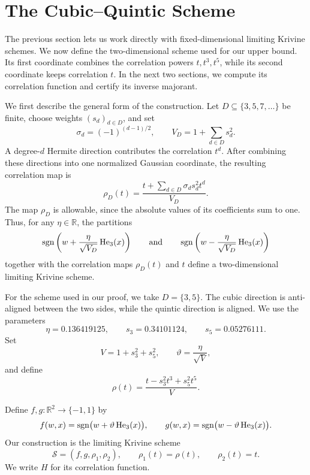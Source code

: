 \section{The Cubic--Quintic Scheme}
\label{sec:scheme}

The previous section lets us work directly with fixed-dimensional limiting
Krivine schemes. We now define the two-dimensional scheme used for our upper
bound. Its first coordinate combines the correlation powers \(t,t^3,t^5\),
while its second coordinate keeps correlation \(t\). In the next two sections,
we compute its correlation function and certify its inverse majorant.

We first describe the general form of the construction. Let
\(D\subseteq\{3,5,7,\ldots\}\) be finite, choose weights
\((s_d)_{d\in D}\), and set
\[
    \sigma_d=(-1)^{(d-1)/2},
    \qquad
    V_D=1+\sum_{d\in D}s_d^2.
\]
A degree-\(d\) Hermite direction contributes the correlation \(t^d\).
After combining these directions into one normalized Gaussian coordinate,
the resulting correlation map is
\begin{equation}
    \rho_D(t)
    =
    \frac{t+\sum_{d\in D}\sigma_d s_d^2 t^d}{V_D}.
    \label{eq:general-hermite-correlation-map}
\end{equation}
The map \(\rho_D\) is allowable, since the absolute values of its
coefficients sum to one. Thus, for any \(\eta\in\mathbb{R}\), the partitions
\[
    \operatorname{sgn}\left(
        w+\frac{\eta}{\sqrt{V_D}}\operatorname{He}_3(x)
    \right)
    \qquad\text{and}\qquad
    \operatorname{sgn}\left(
        w-\frac{\eta}{\sqrt{V_D}}\operatorname{He}_3(x)
    \right)
\]
together with the correlation maps \(\rho_D(t)\) and \(t\) define a
two-dimensional limiting Krivine scheme.

For the scheme used in our proof, we take \(D=\{3,5\}\). The cubic
direction is anti-aligned between the two sides, while the quintic direction
is aligned. We use the parameters
\begin{equation}
    \eta=0.136419125,
    \qquad
    s_3=0.34101124,
    \qquad
    s_5=0.05276111.
    \label{eq:params}
\end{equation}
Set
\[
    V=1+s_3^2+s_5^2,
    \qquad
    \vartheta=\frac{\eta}{\sqrt V},
\]
and define
\begin{equation}
    \rho(t)
    =
    \frac{t-s_3^2t^3+s_5^2t^5}{V}.
    \label{eq:rho-collapsed}
\end{equation}

\begin{definition}
\label{def:cubic-quintic-scheme}
Define \(f,g:\mathbb{R}^2\to\{-1,1\}\) by
\begin{equation}
    f(w,x)
    =
    \operatorname{sgn}\bigl(w+\vartheta\operatorname{He}_3(x)\bigr),
    \qquad
    g(w,x)
    =
    \operatorname{sgn}\bigl(w-\vartheta\operatorname{He}_3(x)\bigr).
    \label{eq:cubic-quintic-partitions}
\end{equation}
Our construction is the limiting Krivine scheme
\[
    \mathcal{S}=(f,g,\rho_1,\rho_2),
    \qquad
    \rho_1(t)=\rho(t),
    \qquad
    \rho_2(t)=t.
\]
We write \(H\) for its correlation function.
\end{definition}

